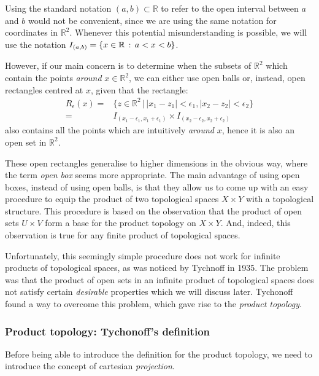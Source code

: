 \begin{remark}
	Using the standard notation $(a,b)\subset\mathbb{R}$ to refer to the
	open interval between $a$ and $b$ would not be convenient, since we are using
	the same notation for coordinates in $\mathbb{R}^2$.
	Whenever this potential misunderstanding is possible, we will use the notation
	$I_{(a,b)} = \left\{x\in\mathbb{R}\,:\,a<x<b\right\}$.
\end{remark}

However, if our main concern is to determine when the subsets of $\mathbb{R}^2$ which contain the points
\emph{around} $x\in\mathbb{R}^2$, we can either use open balls or, instead, open
rectangles centred at $x$, given that the rectangle:
\begin{align*}
R_\epsilon(x) =& \{z\in\mathbb{R}^2\,|\,|x_1-z_1|<\epsilon_1, |x_2-z_2|<\epsilon_2\} \\
=& I_{(x_1-\epsilon_1, x_1+\epsilon_1)}\times I_{(x_2-\epsilon_2, x_2+\epsilon_2)}
\end{align*}
also contains all the points which are intuitively \emph{around} $x$, hence it is also an
open set in $\mathbb{R}^2$.

These open rectangles generalise to higher dimensions in the obvious way, where the
term \emph{open box} seems more appropriate.
The main advantage of using open boxes,
instead of using open balls, is that they allow us to come up with an easy procedure
to equip the product of two topological spaces $X \times Y$ with a topological structure.
This procedure is based on the observation that the product of open sets
$U \times V$ form a base for the product topology on $X \times Y$.
And, indeed, this observation is true for any finite product of topological spaces.

Unfortunately, this seemingly simple procedure does not work for infinite products of
topological spaces, as was noticed by Tychnoff in 1935.
The problem was that the product of open sets in an infinite product of topological
spaces does not satisfy certain \emph{desirable} properties which we will discuss later.
Tychonoff found a way to overcome this problem, which gave rise to the \emph{product topology}.

\subsubsection{Product topology: Tychonoff's definition}\label{subsubsec:product-topology}

Before being able to introduce the definition for the product topology, we need to
introduce the concept of cartesian \emph{projection}.

